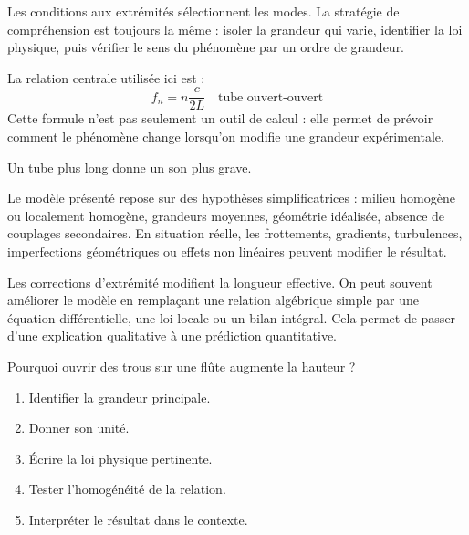 \documentclass[11pt,a4paper]{article}
\begin{document}
\begin{methodebox}
Les conditions aux extrémités sélectionnent les modes.
La stratégie de compréhension est toujours la même : isoler la grandeur qui varie, identifier la loi physique, puis vérifier le sens du phénomène par un ordre de grandeur.
\end{methodebox}

\begin{theorembox}
La relation centrale utilisée ici est :
\[
f_n=n\frac{c}{2L}\quad\text{tube ouvert-ouvert}
\]
Cette formule n'est pas seulement un outil de calcul : elle permet de prévoir comment le phénomène change lorsqu'on modifie une grandeur expérimentale.
\end{theorembox}

\begin{odgbox}
Un tube plus long donne un son plus grave.
\end{odgbox}

\begin{attentionbox}
Le modèle présenté repose sur des hypothèses simplificatrices : milieu homogène ou localement homogène, grandeurs moyennes, géométrie idéalisée, absence de couplages secondaires. En situation réelle, les frottements, gradients, turbulences, imperfections géométriques ou effets non linéaires peuvent modifier le résultat.
\end{attentionbox}

\begin{approfondissementbox}
Les corrections d'extrémité modifient la longueur effective.
On peut souvent améliorer le modèle en remplaçant une relation algébrique simple par une équation différentielle, une loi locale ou un bilan intégral. Cela permet de passer d'une explication qualitative à une prédiction quantitative.
\end{approfondissementbox}

\begin{exercicebox}
Pourquoi ouvrir des trous sur une flûte augmente la hauteur ?
\begin{enumerate}
  \item Identifier la grandeur principale.
  \item Donner son unité.
  \item Écrire la loi physique pertinente.
  \item Tester l'homogénéité de la relation.
  \item Interpréter le résultat dans le contexte.
\end{enumerate}
\end{exercicebox}
\end{document}
